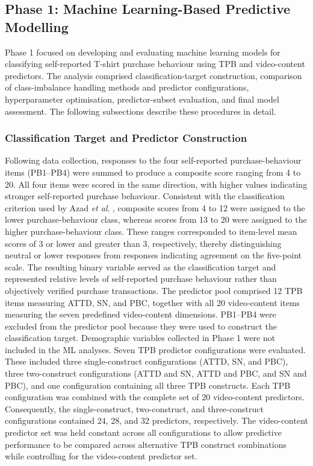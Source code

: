 \documentclass[jtaer,article,submit,moreauthors]{Definitions/mdpi}
\begin{document}
\subsection{Phase 1: Machine Learning-Based Predictive Modelling}
Phase 1 focused on developing and evaluating machine learning models for classifying self-reported T-shirt purchase behaviour using TPB and video-content predictors. The analysis comprised classification-target construction, comparison of class-imbalance handling methods and predictor configurations, hyperparameter optimisation, predictor-subset evaluation, and final model assessment. The following subsections describe these procedures in detail.

\subsubsection{Classification Target and Predictor Construction}
Following data collection, responses to the four self-reported
purchase-behaviour items (PB1--PB4) were summed to produce a composite
score ranging from 4 to 20. All four items were scored in the same
direction, with higher values indicating stronger self-reported
purchase behaviour.
Consistent with the classification criterion used by Azad
\textit{et al}. \cite{Azad2023}, composite scores from 4 to 12 were
assigned to the lower purchase-behaviour class, whereas scores from
13 to 20 were assigned to the higher purchase-behaviour class. These
ranges corresponded to item-level mean scores of 3 or lower and greater
than 3, respectively, thereby distinguishing neutral or lower
responses from responses indicating agreement on the five-point
scale. The resulting binary variable served as the classification
target and represented relative levels of self-reported purchase
behaviour rather than objectively verified purchase transactions.
The predictor pool comprised 12 TPB items measuring ATTD, SN, and PBC,
together with all 20 video-content items measuring the seven
predefined video-content dimensions. PB1--PB4 were excluded from the predictor pool because they were used
to construct the classification target. Demographic variables collected
in Phase 1 were not included in the ML analyses.
Seven TPB predictor configurations were evaluated. These
included three single-construct configurations (ATTD, SN, and PBC),
three two-construct configurations (ATTD and SN, ATTD and PBC, and SN
and PBC), and one configuration containing all three TPB constructs.
Each TPB configuration was combined with the complete set of 20
video-content predictors. Consequently, the single-construct,
two-construct, and three-construct configurations contained 24, 28,
and 32 predictors, respectively.
The video-content predictor set was held constant across all
configurations to allow predictive performance to be compared across
alternative TPB construct combinations while controlling for the
video-content predictor set.
\end{document}

